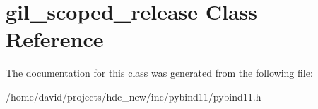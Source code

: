 \hypertarget{classgil__scoped__release}{}\section{gil\+\_\+scoped\+\_\+release Class Reference}
\label{classgil__scoped__release}


The documentation for this class was generated from the following file\+:\begin{DoxyCompactItemize}
\item 
/home/david/projects/hdc\+\_\+new/inc/pybind11/pybind11.\+h\end{DoxyCompactItemize}

